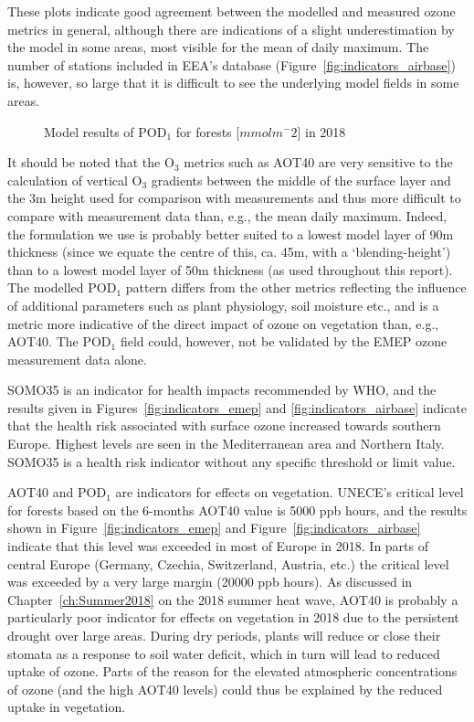 These plots indicate good agreement between the modelled and measured ozone metrics in general, although there are indications of a slight underestimation by the model in some areas, most visible for the mean of daily maximum. The number of stations included in EEA's database (Figure~\ref{fig:indicators_airbase}) is, however, so large that it is difficult to see the underlying model fields in some areas.

\begin{figure}[H]
\caption{Model results of POD$_1$ for forests [$mmol m^-2$] in 2018}
\label{fig:indicatorPOD}
\end{figure}

It should be noted that the O$_3$ metrics such as AOT40 are very sensitive to the calculation of vertical O$_3$ gradients between the middle of the surface layer and the 3m height used for comparison with measurements \citep{Tuovinen:EP2007} and thus more difficult to compare with measurement data than, e.g., the mean daily maximum. Indeed, the formulation we use \citep{Simpson_et_al:EMEP} is probably better suited to a lowest model layer of 90m thickness (since we equate the centre of this, ca. 45m, with a `blending-height') than to a lowest model layer of 50m thickness (as used throughout this report). 
The modelled POD$_1$ pattern differs from the other metrics reflecting the influence of additional parameters such as plant physiology, soil moisture etc., and is a metric more indicative of the direct impact of ozone on vegetation than, e.g., AOT40. The POD$_1$ field could, however, not be validated by the EMEP ozone measurement data alone. 

SOMO35 is an indicator for health impacts recommended by WHO, and the results given in Figures~\ref{fig:indicators_emep} and \ref{fig:indicators_airbase} indicate that the health risk associated with surface ozone increased towards southern Europe. Highest levels are seen in the Mediterranean area and Northern Italy. SOMO35 is a health risk indicator without any specific threshold or limit value.

AOT40 and POD$_1$ are indicators for effects on vegetation. UNECE's critical level for forests based on the 6-months AOT40 value is 5000 ppb hours, and the results shown in Figure~\ref{fig:indicators_emep} and Figure~\ref{fig:indicators_airbase} indicate that this level was exceeded in most of Europe in 2018. In parts of central Europe (Germany, Czechia, Switzerland, Austria, etc.) the critical level was exceeded by a very large margin (20000 ppb hours). As discussed in Chapter~\ref{ch:Summer2018} on the 2018 summer heat wave, AOT40 is probably a particularly poor indicator for effects on vegetation in 2018 due to the persistent drought over large areas. During dry periods, plants will reduce or close their stomata as a response to soil water deficit, which in turn will lead to reduced uptake of ozone. Parts of the reason for the elevated atmospheric concentrations of ozone (and the high AOT40 levels) could thus be explained by the reduced uptake in vegetation. 

